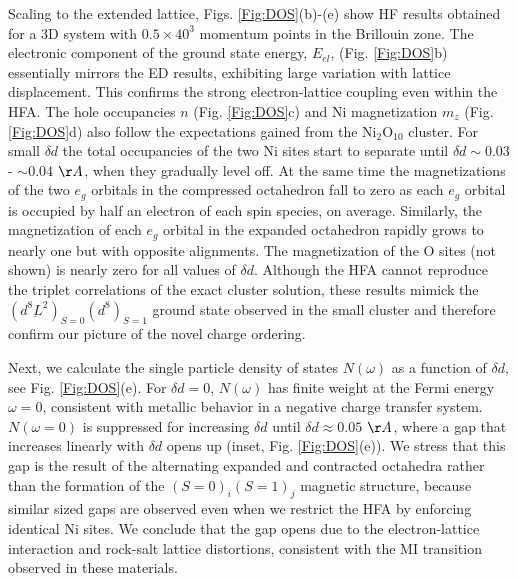 \documentclass[showpacs,preprintnumbers,amsmath,amssymb,prl,aps,twocolumn,superscriptaddress]{revtex4}
\newcommand{\ligand}{{\underbar L}}
\begin{document}
Scaling to the extended lattice, Figs. \ref{Fig:DOS}(b)-(e) show HF results
obtained for a 3D system with $0.5\times40^3$ momentum points in the
 Brillouin zone. The electronic component of the ground state energy,
 $E_{el}$, 
(Fig. \ref{Fig:DOS}b) essentially mirrors the ED results, exhibiting
large variation with lattice displacement.  This confirms the strong
electron-lattice coupling  even within the HFA.  The hole
occupancies $n$ (Fig. \ref{Fig:DOS}c) and Ni magnetization $m_z$
(Fig. \ref{Fig:DOS}d) also follow the expectations gained from the
Ni$_2$O$_{10}$ cluster.  For small $\delta d$ the total
occupancies of the two Ni sites start to separate until $\delta d \sim
0.03$ - $\sim 0.04$ $\AA$, when they gradually level off. At
the same time the magnetizations of the two $e_g$ orbitals in the
compressed octahedron fall to zero as each $e_g$ orbital is occupied
by half an electron of each spin species, on average. Similarly, the
magnetization of each $e_g$ orbital in the expanded octahedron rapidly
grows to nearly one but with opposite alignments. The magnetization of
the O sites (not shown) is nearly zero for all values of $\delta
d$.  Although the HFA cannot reproduce the triplet
correlations of the exact cluster solution, these results mimick
the $(d^8\ligand^2)_{S = 0}(d^8)_{S=1}$ ground state observed in 
the small cluster and therefore confirm our picture
of the novel charge ordering.

Next, we calculate the single particle density of states $N(\omega)$
as a function of $\delta d$, see Fig. \ref{Fig:DOS}(e). For $\delta
d=0$, $N(\omega)$ has finite weight at the Fermi energy $\omega=0$,
consistent with metallic behavior in a negative charge transfer
system. $N(\omega=0)$ is suppressed  for increasing $\delta d$ until
$\delta d \approx 0.05$ $\AA$, where a gap that increases linearly
with $\delta d$ opens up (inset, Fig. \ref{Fig:DOS}(e)).  We stress
that this gap is the result of the alternating expanded and
contracted octahedra rather than the formation of the $(S =
0)_i(S = 1)_j$ magnetic structure, because similar sized gaps are
observed even when we restrict the HFA by enforcing identical Ni sites. 
We conclude that the gap opens due
to the electron-lattice interaction and rock-salt lattice distortions,
consistent with the MI transition observed in these materials.
\end{document}

